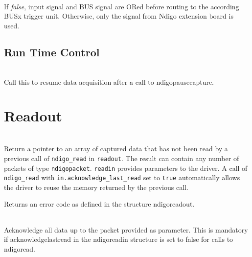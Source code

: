             \\
            If \textit{false}, input signal and BUS signal are ORed before routing to the according BUSx trigger unit. Otherwise, only the signal from Ndigo extension board is used.

        \subsection{Run Time Control}

            \par

            \par

            \\
            Call this to resume data acquisition after a call to \textsf{ndigo\tu pause\tu capture}.\par


    \section{Readout\label{cp:readout}}

          \\
        Return a pointer to an array of captured data that has not been read by a previous call of \texttt{ndigo\_read} in \texttt{read\tu out}. The result can contain any number of packets of type \texttt{ndigo\tu packet}. \texttt{read\tu in} provides parameters to the driver. A call of \texttt{ndigo\_read} with \texttt{in.acknowledge\_last\_read} set to \texttt{true} automatically allows the driver to reuse the memory returned by the previous call.\par

        Returns an error code as defined in the structure \textsf{ndigo\tu read\tu out}.\par

         \\
        Acknowledge all data up to the packet provided as parameter. This is mandatory if \textsf{acknowledge\tu last\tu read} in the \textsf{ndigo\tu read\tu in} structure is set to false for calls to \textsf{ndigo\tu read}.\par

